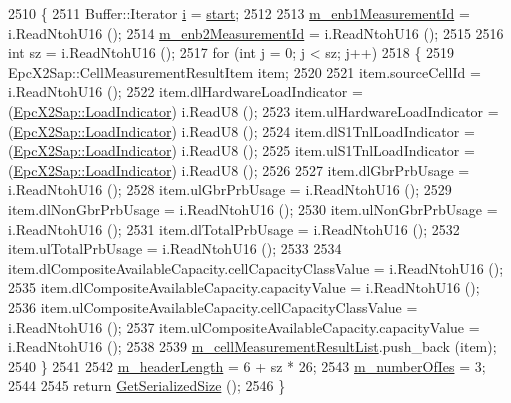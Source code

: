 \begin{DoxyCode}
2510 \{
2511   Buffer::Iterator \hyperlink{bernuolliDistribution_8m_a6f6ccfcf58b31cb6412107d9d5281426}{i} = \hyperlink{namespacevisualizer_1_1core_a2a35e5d8a34af358b508dac8635754e0}{start};
2512 
2513   \hyperlink{classns3_1_1EpcX2ResourceStatusUpdateHeader_a060867e7063bf2f4870a92fb87c57a68}{m\_enb1MeasurementId} = i.ReadNtohU16 ();
2514   \hyperlink{classns3_1_1EpcX2ResourceStatusUpdateHeader_a26cddb3363d7aa29c0c87347a09feeab}{m\_enb2MeasurementId} = i.ReadNtohU16 ();
2515 
2516   \textcolor{keywordtype}{int} sz = i.ReadNtohU16 ();
2517   \textcolor{keywordflow}{for} (\textcolor{keywordtype}{int} j = 0; j < sz; j++)
2518     \{
2519       EpcX2Sap::CellMeasurementResultItem item;
2520 
2521       item.sourceCellId = i.ReadNtohU16 ();
2522       item.dlHardwareLoadIndicator = (\hyperlink{classns3_1_1EpcX2Sap_a5de1a139dac453e4a55347721a8fc76f}{EpcX2Sap::LoadIndicator}) i.ReadU8 ();
2523       item.ulHardwareLoadIndicator = (\hyperlink{classns3_1_1EpcX2Sap_a5de1a139dac453e4a55347721a8fc76f}{EpcX2Sap::LoadIndicator}) i.ReadU8 ();
2524       item.dlS1TnlLoadIndicator = (\hyperlink{classns3_1_1EpcX2Sap_a5de1a139dac453e4a55347721a8fc76f}{EpcX2Sap::LoadIndicator}) i.ReadU8 ();
2525       item.ulS1TnlLoadIndicator = (\hyperlink{classns3_1_1EpcX2Sap_a5de1a139dac453e4a55347721a8fc76f}{EpcX2Sap::LoadIndicator}) i.ReadU8 ();
2526 
2527       item.dlGbrPrbUsage = i.ReadNtohU16 ();
2528       item.ulGbrPrbUsage = i.ReadNtohU16 ();
2529       item.dlNonGbrPrbUsage = i.ReadNtohU16 ();
2530       item.ulNonGbrPrbUsage = i.ReadNtohU16 ();
2531       item.dlTotalPrbUsage = i.ReadNtohU16 ();
2532       item.ulTotalPrbUsage = i.ReadNtohU16 ();
2533 
2534       item.dlCompositeAvailableCapacity.cellCapacityClassValue = i.ReadNtohU16 ();
2535       item.dlCompositeAvailableCapacity.capacityValue = i.ReadNtohU16 ();
2536       item.ulCompositeAvailableCapacity.cellCapacityClassValue = i.ReadNtohU16 ();
2537       item.ulCompositeAvailableCapacity.capacityValue = i.ReadNtohU16 ();
2538 
2539       \hyperlink{classns3_1_1EpcX2ResourceStatusUpdateHeader_abab9be68f01115061ce10d519fa925ab}{m\_cellMeasurementResultList}.push\_back (item);
2540     \}
2541 
2542   \hyperlink{classns3_1_1EpcX2ResourceStatusUpdateHeader_a318694daebc0b9a5f28656dc3a4ebbaa}{m\_headerLength} = 6 + sz * 26;
2543   \hyperlink{classns3_1_1EpcX2ResourceStatusUpdateHeader_ad8852947ec96b2ba25dcfc976d287e1d}{m\_numberOfIes} = 3;
2544 
2545   \textcolor{keywordflow}{return} \hyperlink{classns3_1_1EpcX2ResourceStatusUpdateHeader_add867fd7cb5ff047578098be34c4d315}{GetSerializedSize} ();
2546 \}
\end{DoxyCode}


